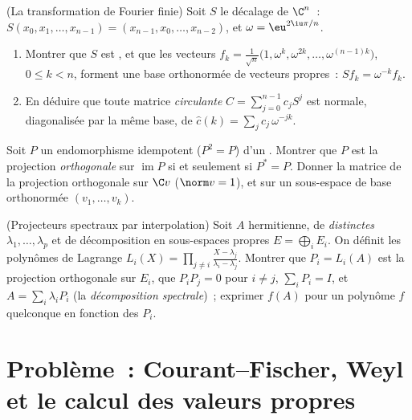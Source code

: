 \begin{exercise}[$\star\star$]\label{exo:b2:hermitian:10}
(La transformation de Fourier finie) Soit $S$ le décalage  de
$\C^n$~: $S(x_0, x_1, \dots, x_{n-1}) = (x_{n-1}, x_0, \dots,
x_{n-2})$, et $\omega = \eu^{2\iu\pi/n}$.
\begin{enumerate}
  \item Montrer que $S$ est , et que les vecteurs $f_k =
        \frac{1}{\sqrt n}\bigl(1, \omega^k, \omega^{2k}, \dots,
        \omega^{(n-1)k}\bigr)$, $0 \leq k < n$, forment une base
        orthonormée de vecteurs propres~: $Sf_k = \omega^{-k}
        f_k$.
  \item En déduire que toute matrice \emph{circulante} $C =
        \sum_{j=0}^{n-1} c_jS^j$ est normale, diagonalisée par la
        même base, de  $\widehat c(k) = \sum_j
        c_j\,\omega^{-jk}$.
\end{enumerate}
\end{exercise}

\begin{exercise}[$\star\star$]\label{exo:b2:hermitian:11}
Soit $P$ un endomorphisme idempotent ($P^2 = P$) d'un . Montrer que $P$ est la projection \emph{orthogonale} sur
$\operatorname{im} P$ si et seulement si $P^* = P$. Donner la matrice
de la projection orthogonale sur $\C v$ ($\norm v = 1$), et
sur un sous-espace de base orthonormée $(v_1, \dots, v_k)$.
\end{exercise}

\begin{exercise}[$\star\star\star$]\label{exo:b2:hermitian:12}
(Projecteurs spectraux par interpolation) Soit $A$ hermitienne, de
 \emph{distinctes} $\lambda_1, \dots, \lambda_p$ et de
décomposition en sous-espaces propres $E = \bigoplus_i E_i$. On
définit les polynômes de Lagrange $L_i(X) = \prod_{j\neq i}\frac{X -
\lambda_j}{\lambda_i - \lambda_j}$. Montrer que $P_i = L_i(A)$
est la projection orthogonale sur $E_i$, que $P_iP_j = 0$ pour
$i \neq j$, $\sum_i P_i = I$, et $A = \sum_i \lambda_iP_i$
(la \emph{décomposition spectrale})~; exprimer $f(A)$ pour un
polynôme $f$ quelconque en fonction des $P_i$.
\end{exercise}

\section{Problème~: Courant--Fischer, Weyl et le calcul des valeurs
propres}

